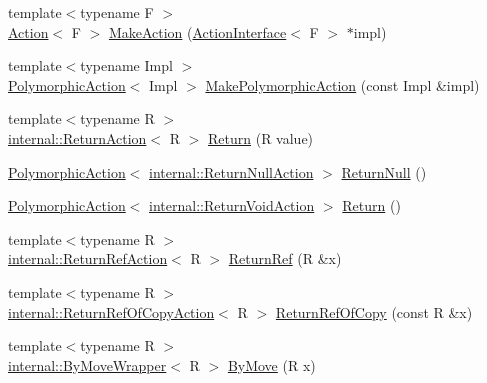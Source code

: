 \begin{DoxyCompactItemize}
\item 
{\footnotesize template$<$typename F $>$ }\\\hyperlink{classtesting_1_1Action}{Action}$<$ F $>$ \hyperlink{namespacetesting_ae6b9960db2b2685e043ce5215291f5b8}{Make\+Action} (\hyperlink{classtesting_1_1ActionInterface}{Action\+Interface}$<$ F $>$ $\ast$impl)
\item 
{\footnotesize template$<$typename Impl $>$ }\\\hyperlink{classtesting_1_1PolymorphicAction}{Polymorphic\+Action}$<$ Impl $>$ \hyperlink{namespacetesting_a36bd06c5ea972c6df0bd9f40a7a94c65}{Make\+Polymorphic\+Action} (const Impl \&impl)
\item 
{\footnotesize template$<$typename R $>$ }\\\hyperlink{classtesting_1_1internal_1_1ReturnAction}{internal\+::\+Return\+Action}$<$ R $>$ \hyperlink{namespacetesting_af6d1c13e9376c77671e37545cd84359c}{Return} (R value)
\item 
\hyperlink{classtesting_1_1PolymorphicAction}{Polymorphic\+Action}$<$ \hyperlink{classtesting_1_1internal_1_1ReturnNullAction}{internal\+::\+Return\+Null\+Action} $>$ \hyperlink{namespacetesting_aa0331596e269114da101f810d3a1b88b}{Return\+Null} ()
\item 
\hyperlink{classtesting_1_1PolymorphicAction}{Polymorphic\+Action}$<$ \hyperlink{classtesting_1_1internal_1_1ReturnVoidAction}{internal\+::\+Return\+Void\+Action} $>$ \hyperlink{namespacetesting_a8da8e53d2e7bc4e3c531f7435ad04823}{Return} ()
\item 
{\footnotesize template$<$typename R $>$ }\\\hyperlink{classtesting_1_1internal_1_1ReturnRefAction}{internal\+::\+Return\+Ref\+Action}$<$ R $>$ \hyperlink{namespacetesting_a18eda8fe9c89ee856c199a2e04ca1641}{Return\+Ref} (R \&x)
\item 
{\footnotesize template$<$typename R $>$ }\\\hyperlink{classtesting_1_1internal_1_1ReturnRefOfCopyAction}{internal\+::\+Return\+Ref\+Of\+Copy\+Action}$<$ R $>$ \hyperlink{namespacetesting_ac1b75444c89371dc25ebcfcc48336201}{Return\+Ref\+Of\+Copy} (const R \&x)
\item 
{\footnotesize template$<$typename R $>$ }\\\hyperlink{structtesting_1_1internal_1_1ByMoveWrapper}{internal\+::\+By\+Move\+Wrapper}$<$ R $>$ \hyperlink{namespacetesting_acaa432211a3aec62e3d0f24b47bd2dae}{By\+Move} (R x)
\item 

\end{DoxyCompactItemize}
